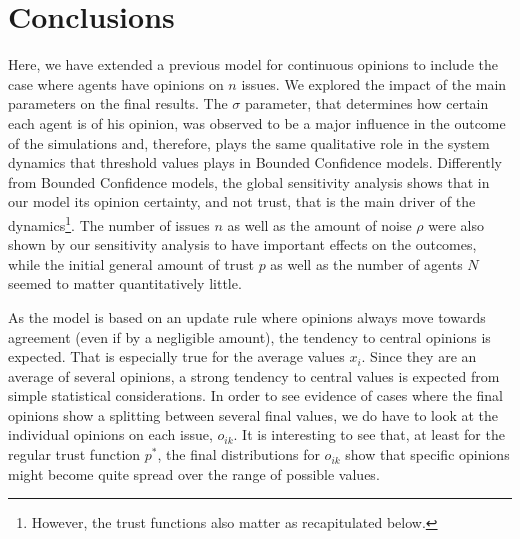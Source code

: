\documentclass{article}
\begin{document}
{    \section{Conclusions}

    Here, we have extended a previous model for continuous opinions
    \cite{martins08c} to include the case where agents have opinions on $n$
    issues. We explored the impact of the main parameters on the final results.
    The \(\sigma\) parameter, that determines how certain each agent is of his
    opinion, was observed to be a major influence in the outcome of the
    simulations and, therefore, plays the same qualitative role in the system
    dynamics that threshold values plays in Bounded Confidence models.
    Differently from Bounded Confidence models, the global sensitivity analysis
    shows that in our model its opinion certainty, and not trust, that is the
    main driver of the dynamics\footnote{However, the trust functions also
      matter as recapitulated below.}. The number of issues $n$ as well as the
    amount of noise $\rho$ were also shown by our sensitivity analysis to have
    important effects on the outcomes, while the initial general amount of trust
    $p$ as well as the number of agents $N$ seemed to matter quantitatively
    little.

    As the model is based on an update rule where opinions always move towards
    agreement (even if by a negligible amount), the tendency to central opinions
    is expected. That is especially true for the average values $x_i$. Since
    they are an average of several opinions, a strong tendency to central values
    is expected from simple statistical considerations. In order to see evidence
    of cases where the final opinions show a splitting between several final
    values, we do have to look at the individual opinions on each issue,
    $o_{ik}$. It is interesting to see that, at least for the regular trust
    function $p^*$, the final distributions for $o_{ik}$ show that specific
    opinions might become quite spread over the range of possible values.

}
\end{document}
